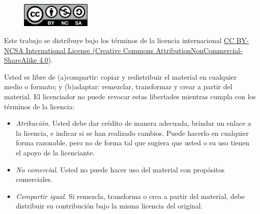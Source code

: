\begin{figure}[H]
    \centering
    \includegraphics[width=0.3\textwidth]{figures/intro/license.png}
\end{figure}

Este trabajo se distribuye bajo los términos de la licencia internacional \href{https://creativecommons.org/licenses/by-nc-sa/4.0/deed.es}{CC BY-NCSA International License (Creative Commons AttributionNonCommercial-ShareAlike 4.0}). 

Usted es libre de (a)compartir: copiar y redistribuir el material en cualquier
medio o formato; y (b)adaptar: remezclar, transformar y crear a partir del material.
El licenciador no puede revocar estas libertades mientras cumpla con los términos de
la licencia:

\begin{itemize}
    \item \textit{Atribución}. Usted debe dar crédito de manera adecuada, brindar un enlace a la licencia, e indicar si se han realizado cambios. Puede hacerlo en cualquier forma razonable, pero no de forma tal que sugiera que usted o su uso tienen el apoyo de la licenciante.
    \item \textit{No comercial}. Usted no puede hacer uso del material con propósitos comerciales.
     \item \textit{Compartir igual}. Si remezcla, transforma o crea a partir del material, debe distribuir su contribución bajo la misma licencia del original.
\end{itemize}

